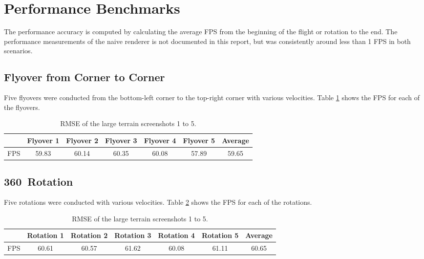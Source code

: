 \section{Performance Benchmarks}
The performance accuracy is computed by calculating the average FPS from the beginning of the flight 
or rotation to the end. The performance measurements of the naive renderer is not documented in this report,
but was consistently around less than 1 FPS in both scenarios.

\subsection{Flyover from Corner to Corner}
Five flyovers were conducted from the bottom-left corner to the top-right corner with various 
velocities. Table \ref{tbl:results-fps-fly} shows the FPS for each of the flyovers.

\begin{table}[H]
  \begin{center}
    \begin{tabular}{ c|c|c|c|c|c|c }
      & Flyover 1 & Flyover 2 & Flyover 3 & Flyover 4 & Flyover 5 & Average\\
      \hline
      FPS & 59.83 & 60.14 & 60.35 & 60.08 & 57.89 & 59.65
    \end{tabular}
  \end{center}
  \caption{RMSE of the large terrain screenshots 1 to 5.}\label{tbl:results-fps-fly}
\end{table}

\subsection{360\textdegree~Rotation}
Five rotations were conducted with various 
velocities. Table \ref{tbl:results-fps-rotations} shows the FPS for each of the rotations.

\begin{table}[H]
  \begin{center}
    \begin{tabular}{ c|c|c|c|c|c|c }
      & Rotation 1 & Rotation 2 & Rotation 3 & Rotation 4 & Rotation 5 & Average\\
      \hline
      FPS & 60.61 & 60.57 & 61.62 & 60.08 & 61.11 & 60.65
    \end{tabular}
  \end{center}
  \caption{RMSE of the large terrain screenshots 1 to 5.}\label{tbl:results-fps-rotations}
\end{table}

